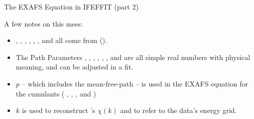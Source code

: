 \begin{slide}{The EXAFS Equation in IFEFFIT (part 2)}

    
  
  \vmm 
  A few notes on this mess:
    
  \begin{itemize}

  \item {}, , , ,
    , , and  all come from
    {\feff} (\feffndat).
    
    
  \item The Path Parameters , , , 
    , , , and   are
    all simple real numbers with physical meaning, and can be adjusted in
    a fit.
    
  \item $p$ -- which includes the mean-free-path -- is used in the EXAFS
    equation for the cumulants ( , ,
    , and )
   
  \item $k$ is used to reconstruct {\feff}'s ${\chi(k)}$ and to
    refer to the data's energy grid.
  \end{itemize}

  \vfill
\end{slide} 


